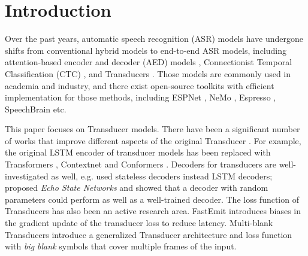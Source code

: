 \documentclass{article}
\begin{document}
\section{Introduction}




Over the past years, automatic speech recognition (ASR) models have undergone shifts from  conventional hybrid models 
\cite{jelinek1998statistical,woodland1994large,povey2011kaldi} to end-to-end ASR models, including attention-based encoder and decoder (AED) models
\cite{chorowski2015attention,chan2015listen}, Connectionist 
Temporal Classification
(CTC) \cite{graves2006connectionist}, 
and Transducers \cite{graves2012sequence}.
Those models are commonly used in academia and industry, and there exist  open-source toolkits with efficient implementation for those methods, including ESPNet \cite{watanabe2018espnet}, NeMo \cite{kuchaiev2019nemo}, Espresso \cite{wang2019espresso}, SpeechBrain \cite{ravanelli2021speechbrain} etc. 

This paper focuses on Transducer models.
There have been a significant number of works that improve different aspects of the original Transducer \cite{graves2012sequence}.
For example, the original LSTM encoder of transducer models has been replaced with Transformers \cite{tian2019self,yeh2019transformer,zhang2020transformer}, Contextnet \cite{contextnet} and Conformers \cite{gulati2020conformer}. 
Decoders for transducers are well-investigated as well, e.g. 
\cite{Ghodsi2020stateless} used stateless decoders instead LSTM decoders;
\cite{shrivastava2021echo} proposed \emph{Echo State Networks} and showed that a decoder with random parameters could perform as well as a well-trained decoder.
The loss function of Transducers has also been an active research area. 
FastEmit  \cite{yu2021fastemit} introduces biases in the gradient update of the transducer loss to reduce latency. Multi-blank Transducers \cite{xu2022multi} introduce a generalized Transducer architecture and loss function with \emph{big blank} symbols that cover multiple frames of the input. 
\end{document}
